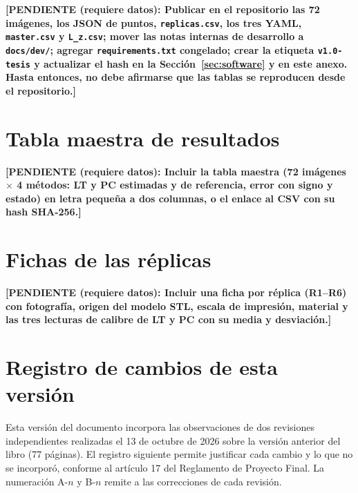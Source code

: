 \documentclass{report}
\newcommand{\pendiente}[1]{\par\textbf{[PENDIENTE (requiere datos): #1]}\par}
\begin{document}
\pendiente{Publicar en el repositorio las 72 imágenes, los JSON de puntos, \texttt{replicas.csv}, los tres YAML, \texttt{master.csv} y \texttt{L\_z.csv}; mover las notas internas de desarrollo a \texttt{docs/dev/}; agregar \texttt{requirements.txt} congelado; crear la etiqueta \texttt{v1.0-tesis} y actualizar el hash en la Sección~\ref{sec:software} y en este anexo. Hasta entonces, no debe afirmarse que las tablas se reproducen desde el repositorio.}

\chapter{Tabla maestra de resultados}
\label{anx:maestra}

\pendiente{Incluir la tabla maestra (72 imágenes $\times$ 4 métodos: LT y PC estimadas y de referencia, error con signo y estado) en letra pequeña a dos columnas, o el enlace al CSV con su hash SHA-256.}

\chapter{Fichas de las réplicas}
\label{anx:fichas}

\pendiente{Incluir una ficha por réplica (R1--R6) con fotografía, origen del modelo STL, escala de impresión, material y las tres lecturas de calibre de LT y PC con su media y desviación.}

\chapter{Registro de cambios de esta versión}
\label{anx:cambios}

Esta versión del documento incorpora las observaciones de dos revisiones independientes realizadas el 13 de octubre de 2026 sobre la versión anterior del libro (77 páginas). El registro siguiente permite justificar cada cambio y lo que no se incorporó, conforme al artículo 17 del Reglamento de Proyecto Final. La numeración A-$n$ y B-$n$ remite a las correcciones de cada revisión.
\end{document}
